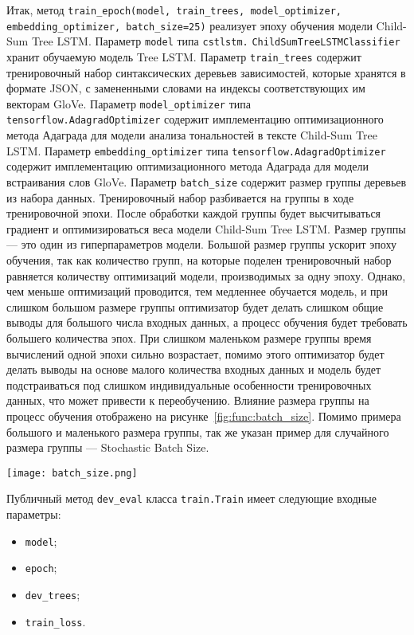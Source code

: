 Итак, метод \texttt{train\_epoch(model, train\_trees, model\_op\-timizer, embedding\_optimizer, batch\_size=25)} реализует эпоху обучения модели Child-Sum Tree LSTM\@. Параметр \texttt{model} типа \texttt{cstlstm.} \texttt{ChildSumTreeLSTMCla\-ssifier} хранит обучаемую модель Tree LSTM\@. Параметр \texttt{train\-\_trees} содержит тренировочный набор синтаксических деревьев зависимостей, которые хранятся в формате JSON\@, с замененными словами на индексы соответствующих им векторам GloVe. Параметр \texttt{model\-\_optimizer} типа \texttt{tensorflow.AdagradOptimizer} содержит имплементацию оптимизационного метода Адаграда для модели анализа тональностей в тексте Child-Sum Tree LSTM\@. Параметр \texttt{embedding\_optimizer} типа \texttt{tensorflow.AdagradOptimizer} содержит имплементацию оптимизационного метода Адаграда для модели встраивания слов GloVe. Параметр \texttt{batch\_size} содержит размер группы деревьев из набора данных. Тренировочный набор разбивается на группы в ходе тренировочной эпохи. После обработки каждой группы будет высчитываться градиент и оптимизироваться веса модели Child-Sum Tree LSTM\@. Размер группы --- это один из гиперпараметров модели. Большой размер группы ускорит эпоху обучения, так как количество групп, на которые поделен тренировочный набор равняется количеству оптимизаций модели, производимых за одну эпоху. Однако, чем меньше оптимизаций проводится, тем медленнее обучается модель, и при слишком большом размере группы оптимизатор будет делать слишком общие выводы для большого числа входных данных, а процесс обучения будет требовать большего количества эпох. При слишком маленьком размере группы время вычислений одной эпохи сильно возрастает, помимо этого оптимизатор будет делать выводы на основе малого количества входных данных и модель будет подстраиваться под слишком индивидуальные особенности тренировочных данных, что может привести к переобучению. Влияние размера группы на процесс обучения отображено на рисунке~\ref{fig:func:batch_size}. Помимо примера большого и маленького размера группы, так же указан пример для случайного размера группы --- Stochastic Batch Size.

\begin{center}
  \texttt{[image: batch\_size.png]}
  \label{fig:func:batch_size}
\end{center}

Публичный метод \texttt{dev\_eval} класса \texttt{train.Train} имеет следующие входные параметры:
\begin{itemize}
\item \texttt{model};
\item \texttt{epoch};
\item \texttt{dev\_trees};
\item \texttt{train\_loss}.
\end{itemize}

